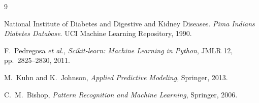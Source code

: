 \documentclass[12pt,a4paper]{article}
\begin{document}
\newpage
\begin{thebibliography}{9}

National Institute of Diabetes and Digestive and Kidney Diseases.
\emph{Pima Indians Diabetes Database}. UCI Machine Learning Repository, 1990.

F.~Pedregosa \emph{et al.},
\emph{Scikit-learn: Machine Learning in Python}, JMLR 12, pp.~2825--2830, 2011.

M.~Kuhn and K.~Johnson,
\emph{Applied Predictive Modeling}, Springer, 2013.

C.~M.~Bishop,
\emph{Pattern Recognition and Machine Learning}, Springer, 2006.

\end{thebibliography}
\end{document}
